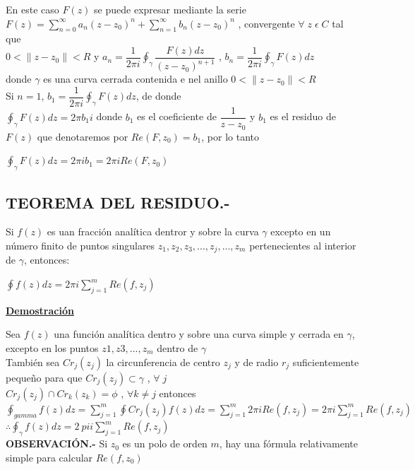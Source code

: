 \documentclass[10pt,a4paper]{article}
\begin{document}
En este caso $F(z)$ se puede expresar mediante la serie \\
$\displaystyle{F(z) = \sum_{n = 0}^{\infty} a_n(z-z_0)^n + \sum_{n = 1}^{\infty} b_n(z-z_0)^n}$ , convergente $\forall \; z \; \epsilon \; C$ tal que \\
$\displaystyle{0 < \parallel z - z_0 \parallel < R}$ y $\displaystyle{a_n = \dfrac{1}{2 \pi i } \oint_{\gamma} \dfrac{F(z)dz}{(z-z_0)^{n+1}}}$ , $\displaystyle {b_n = \dfrac{1}{2 \pi i } \oint_{\gamma} F(z) dz}$ \\
donde $\gamma$ es una curva cerrada contenida e nel anillo $0 < \parallel z - z_0 \parallel < R$ \\
Si $n = 1$, $\displaystyle {b_1= \dfrac{1}{2 \pi i} \oint_{\gamma} F(z) dz}$, de donde \\
$\displaystyle{\oint_{\gamma} F(z)dz = 2 \pi b_1 i}$ donde $b_1$ es el coeficiente de $\dfrac{1}{z-z_0}$ y $b_1$ es el residuo de $F(z)$ que denotaremos por $Re(F,z_0) = b_1$, por lo tanto\\
\begin{center}
$\displaystyle{\oint_{\gamma} F(z)dz = 2 \pi i b_1 = 2 \pi i Re(F,z_0)}$\\
\end{center}
\subsection{TEOREMA DEL RESIDUO.-}
Si $f(z)$ es uan fracción analítica dentror y sobre la curva $\gamma$ excepto en un número finito de puntos singulares $z_1,z_2,z_3,...,z_j,...,z_m$ pertenecientes al interior de $\gamma$, entonces: \\
\begin{center}
$\displaystyle{\oint f(z)dz = 2 \pi i \sum_{j = 1}^m Re(f,z_j)}$
\end{center}
\begin{center}
\textbf{\underline{Demostración}}
\end{center}
Sea $f(z)$ una función analítica dentro y sobre una curva simple y cerrada en $\gamma$, excepto en los puntos $z1,z3,...,z_m$ dentro de $\gamma$ \\
También sea $Cr_j(z_j)$ la circunferencia de centro $z_j$ y de radio $r_j$ suficientemente pequeño para que $Cr_j (z_j) \subset \gamma$ , $\forall \; j$\\
$Cr_j (z_j) \cap Cr_k (z_k) = \phi$ , $\forall k \neq j$ entonces \\
$\displaystyle{\oint_{gamma} f(z)dz = \sum_{j = 1}^{m} \oint Cr_j(z_j) f(z)dz = \sum_{j=1}^{m} 2 \pi i Re(f,z_j) = 2 \pi i \sum_{j = 1}^{m} Re(f,z_j)}$\\
$\displaystyle{\therefore \oint_{\gamma} f(z)dz = 2 \ pi i \sum_{j = 1}^{m} Re(f, z_j)}$ \\
\textbf{OBSERVACIÓN.- } Si $z_0$ es un polo de orden $m$, hay una fórmula relativamente simple para calcular $Re(f,z_0)$
\end{document}
